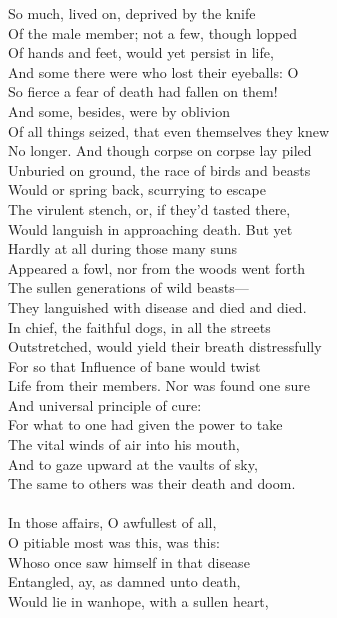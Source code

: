 So much, lived on, deprived by the knife\\
Of the male member; not a few, though lopped\\
Of hands and feet, would yet persist in life,\\
And some there were who lost their eyeballs: O\\
So fierce a fear of death had fallen on them!\\
And some, besides, were by oblivion\\
Of all things seized, that even themselves they knew\\
No longer. And though corpse on corpse lay piled\\
Unburied on ground, the race of birds and beasts\\
Would or spring back, scurrying to escape\\
The virulent stench, or, if they'd tasted there,\\
Would languish in approaching death. But yet\\
Hardly at all during those many suns\\
Appeared a fowl, nor from the woods went forth\\
The sullen generations of wild beasts—\\
They languished with disease and died and died.\\
In chief, the faithful dogs, in all the streets\\
Outstretched, would yield their breath distressfully\\
For so that Influence of bane would twist\\
Life from their members. Nor was found one sure\\
And universal principle of cure:\\
For what to one had given the power to take\\
The vital winds of air into his mouth,\\
And to gaze upward at the vaults of sky,\\
The same to others was their death and doom.\\
\\
In those affairs, O awfullest of all,\\
O pitiable most was this, was this:\\
Whoso once saw himself in that disease\\
Entangled, ay, as damned unto death,\\
Would lie in wanhope, with a sullen heart,\\
